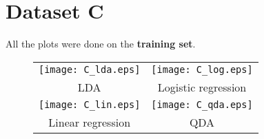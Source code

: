 \documentclass[a4paper,11pt]{article}
\begin{document}
\newpage
\section*{Dataset C}
All the plots were done on the \textbf{training set}.
\begin{figure}[h!]
\centering
\begin{tabular}{cc}
  \texttt{[image: C\_lda.eps]} &   \texttt{[image: C\_log.eps]} \\
LDA & Logistic regression \\[6pt]
 \texttt{[image: C\_lin.eps]} &   \texttt{[image: C\_qda.eps]} \\
Linear regression & QDA \\[6pt]
\end{tabular}
\end{figure}
\end{document}
